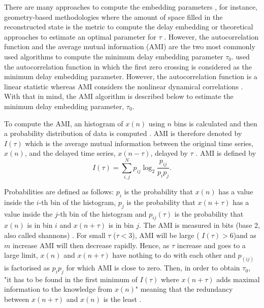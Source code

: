 There are many approaches to compute the embedding parameters 
\citep{bradley2015}, for instance, geometry-based methodologies where 
the amount of space filled in the reconstructed state is the metric to 
compute the delay embedding \citep{mrosenstein1994} or 
theoretical approaches to estimate an optimal parameter for 
$\tau$ \cite{casdagli1991}. 
However, the autocorrelation function and the average mutual information 
(AMI) are the two most commonly used algorithms to compute the minimum 
delay embedding parameter $\tau_0$. \cite{emrani2014a} used the 
autocorrelation function in which the first zero crossing is considered 
as the minimum delay embedding parameter. However, the autocorrelation 
function is a linear statistic whereas AMI considers the nonlinear 
dynamical correlations \citep{afraser1986,krakovska2015}.
With that in mind, the AMI algorithm is described below to estimate 
the minimum delay embedding parameter, \texorpdfstring{$\tau_0$}{T}.

To compute the AMI, an histogram of $x(n)$ using $n$ bins is calculated
and then a probability distribution of data is computed \citep{kantz2003}.
AMI is therefore denoted by $I(\tau)$ which is the average mutual 
information between the original time series, $x(n)$, and the delayed time 
series, $x(n-\tau)$, delayed by $\tau$ \citep{kabiraj2012}. AMI is defined by
\begin{equation}\label{eq:ami}
I(\tau) = \sum_{i,j}^N p_{ij} \log_2 \frac{ p_{ij} }{ p_i p_j }.
\end{equation}

Probabilities are defined as follows: 
$p_i$ is the probability that $x(n)$ has a value inside the $i$-th bin of 
the histogram, $p_j$ is the probability that $x(n+\tau)$ has a value inside 
the $j$-th bin of the histogram and $p_{ij}(\tau)$ is the probability 
that $x(n)$ is in bin $i$ and $x(n+\tau)$ is in bin $j$.
The AMI is measured in bits (base 2, also called shannons) 
\citep{kantz2003, nonlinearTseries2016}.
For small $\tau$ ($\tau < 3$), AMI will be large ( $I(\tau)>6$)and as 
$m$ increase AMI will then decrease rapidly. Hence, as $\tau$ increase 
and goes to a large limit, $x(n)$ and $x(n+\tau)$ have 
nothing to do with each other and $p_(ij)$ is factorised as $p_ip_j$ for 
which AMI is close to zero.  Then, in order to obtain $\tau_0$, 
"it has to be found in the first minimum of $I(\tau)$ where $x(n+\tau)$ 
adds maximal information to the knowledge from $x(n)$" meaning that the 
redundancy between $x(n+\tau)$ and $x(n)$ is the least
\citep[p. 151]{kantz2003}.

